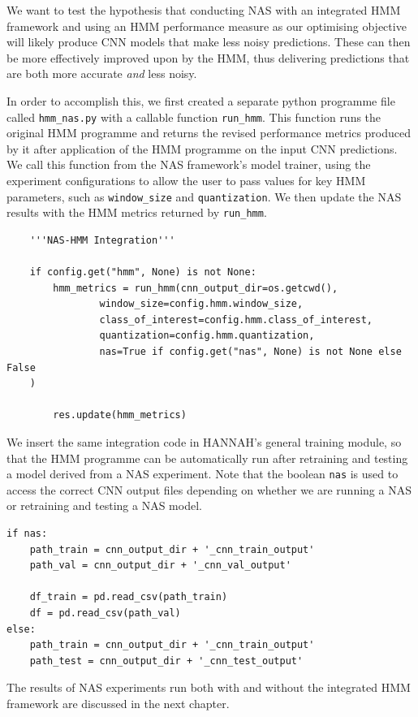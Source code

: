 \documentclass[11pt,a4paper, open=any]{scrbook}
\newcommand{\py}[1]{\texttt{#1}}
\begin{document}
We want to test the hypothesis that conducting NAS with an integrated HMM framework and using an HMM performance measure as our optimising objective will likely produce CNN models that make less noisy predictions. These can then be more effectively improved upon by the HMM, thus delivering predictions that are both more accurate \textit{and} less noisy.

In order to accomplish this, we first created a separate python programme file called \py{hmm_nas.py} with a callable function \py{run_hmm}. This function runs the original HMM programme and returns the revised performance metrics produced by it after application of the HMM programme on the input CNN predictions. We call this function from the NAS framework's model trainer, using the experiment configurations to allow the user to pass values for key HMM parameters, such as \py{window_size} and \py{quantization}. We then update the NAS results with the HMM metrics returned by \py{run_hmm}.

\begin{verbatim}
	'''NAS-HMM Integration'''
	
	if config.get("hmm", None) is not None:
		hmm_metrics = run_hmm(cnn_output_dir=os.getcwd(),
				window_size=config.hmm.window_size,
				class_of_interest=config.hmm.class_of_interest,
				quantization=config.hmm.quantization,
				nas=True if config.get("nas", None) is not None else False
	)
	
		res.update(hmm_metrics)
\end{verbatim}

We insert the same integration code in HANNAH's general training module, so that the HMM programme can be automatically run after retraining and testing a model derived from a NAS experiment. Note that the boolean \py{nas} is used to access the correct CNN output files depending on whether we are running a NAS or retraining and testing a NAS model.


\begin{verbatim}
if nas:
	path_train = cnn_output_dir + '_cnn_train_output'
	path_val = cnn_output_dir + '_cnn_val_output'
	
	df_train = pd.read_csv(path_train)
	df = pd.read_csv(path_val)
else:
	path_train = cnn_output_dir + '_cnn_train_output'
	path_test = cnn_output_dir + '_cnn_test_output'
\end{verbatim}

The results of NAS experiments run both with and without the integrated HMM framework are discussed in the next chapter.
\end{document}
